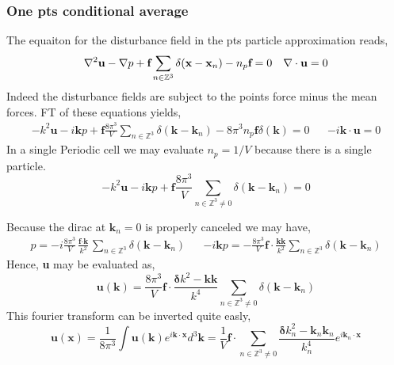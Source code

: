 \subsubsection{One pts conditional average}
The equaiton for the disturbance field in the pts particle approximation reads, 
\begin{align}
    \mathbf{\nabla}^2 \textbf{u} - \mathbf{\nabla} p + \textbf{f} \sum_{n\in \mathbb{Z}^3} \delta(\textbf{x}-\textbf{x}_n) - n_p \textbf{f} = 0 && \mathbf{\nabla}\cdot \textbf{u} =0 
\end{align}
Indeed the disturbance fields are subject to the points force minus the mean forces. 
FT of these equations yields, 
\begin{align}
    -k^2 \textbf{u} - i\textbf{k} p + \textbf{f}\frac{8\pi^3}{V}\sum_{n\in \mathbb{Z}^3} \delta(\textbf{k}-\textbf{k}_n) - 8\pi^3 n_p \textbf{f}\delta(\textbf{k})= 0 
    && -i\textbf{k}\cdot  \textbf{u} =0 
\end{align}
In a single Periodic cell we may evaluate $n_p = 1/V$ because there is a single particle. 
\begin{equation}
    -k^2 \textbf{u} - i\textbf{k} p + \textbf{f}\frac{8\pi^3}{V}\sum_{n\in \mathbb{Z}^3\neq 0} \delta(\textbf{k}-\textbf{k}_n) = 0 
\end{equation}

Because the dirac at $\textbf{k}_n = 0$ is properly canceled we may have, 
\begin{align*}
    p =  -  i \frac{8\pi^3}{V} \frac{\textbf{f}\cdot \textbf{k}}{k^2}\sum_{n\in \mathbb{Z}^3} \delta(\textbf{k}-\textbf{k}_n)
    &&
    -i\textbf{k} p =  - \frac{8\pi^3}{V} \textbf{f}\cdot \frac{\textbf{kk}}{k^2}\sum_{n\in \mathbb{Z}^3} \delta(\textbf{k}-\textbf{k}_n)
\end{align*}
Hence, \textbf{u} may be evaluated as, 
\begin{equation}
    \textbf{u}(\textbf{k})
    =
    \frac{8\pi^3}{V} \textbf{f}\cdot \frac{\bm\delta k^2 - \textbf{kk}}{k^4}\sum_{n\in \mathbb{Z}^3\neq 0} \delta(\textbf{k}-\textbf{k}_n) 
\end{equation}
This fourier transform can be inverted quite easly, 
\begin{equation}
    \textbf{u}(\textbf{x})
    =
    \frac{1}{8\pi^3}\int \textbf{u}(\textbf{k}) e^{i\textbf{k}\cdot \textbf{x}} d^3\textbf{k}
    =
    \frac{1}{V} \textbf{f}\cdot \sum_{n\in \mathbb{Z}^3\neq 0} \frac{\bm\delta k_n^2 - \textbf{k}_n\textbf{k}_n}{k_n^4} e^{i \textbf{k}_n \cdot \textbf{x}}
\end{equation}
